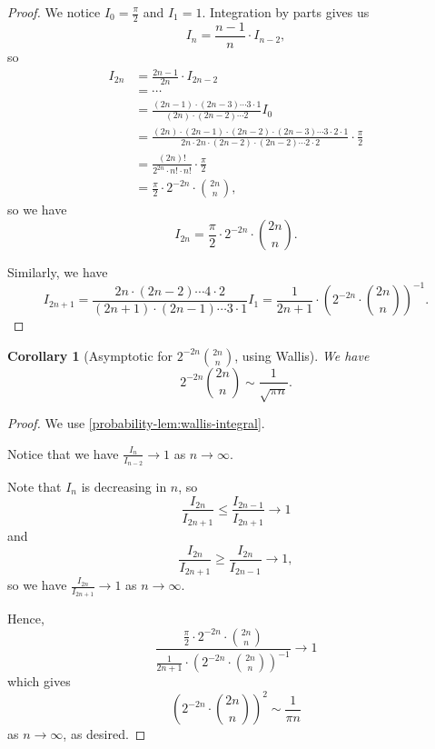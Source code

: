\documentclass[11pt]{article}
\numberwithin{equation}{section}
\newtheorem{corollary}[theorem]{Corollary}
\theoremstyle{definition}
\theoremstyle{remark}
\newcommand{\pqty}[1]{\left(#1\right)}
\newcommand{\inverse}{^{-1}}
\begin{document}
\begin{proof}\label{probability-proof-005}
    We notice \(I_0 = \frac{\pi}{2}\) and \(I_1 = 1\). Integration by parts gives us
    \[
        I_n = \frac{n - 1}{n} \cdot I_{n - 2},
    \]
    so
    \begin{align*}
        I_{2n} &= \frac{2n - 1}{2n} \cdot I_{2n - 2} \\
        &= \cdots \\
        &= \frac{\pqty{2n - 1} \cdot \pqty{2n - 3} \cdots 3 \cdot 1}{\pqty{2n} \cdot \pqty{2n - 2} \cdots 2} I_0 \\
        &= \frac{\pqty{2n} \cdot \pqty{2n - 1} \cdot \pqty{2n - 2} \cdot \pqty{2n - 3} \cdots 3 \cdot 2 \cdot 1}{2n \cdot 2n \cdot \pqty{2n - 2} \cdot \pqty{2n - 2} \cdots 2 \cdot 2} \cdot \frac{\pi}{2} \\
        &= \frac{\pqty{2n}!}{2^{2n} \cdot n! \cdot n!} \cdot \frac{\pi}{2} \\
        &= \frac{\pi}{2} \cdot 2^{-2n} \cdot \binom{2n}{n},
    \end{align*}
    so we have
    \[
        I_{2n} = \frac{\pi}{2} \cdot 2^{-2n} \cdot \binom{2n}{n}.
    \]

    Similarly, we have
    \[
        I_{2n + 1} = \frac{2n \cdot \pqty{2n - 2} \cdots 4 \cdot 2}{\pqty{2n + 1} \cdot \pqty{2n - 1} \cdots 3 \cdot 1} I_1 = \frac{1}{2n + 1} \cdot \pqty{2^{-2n} \cdot \binom{2n}{n}}\inverse.
    \]

\end{proof}

\begin{corollary}[Asymptotic for \(2^{-2n} \binom{2n}{n}\), using Wallis]\label{probability-corollary-002}
    \label{probability-cor:asymptotic-binomial-wallis}%
    We have
    \[
        2^{-2n} \binom{2n}{n} \sim \frac{1}{\sqrt{\pi n}}.
    \]
\end{corollary}

\begin{proof}\label{probability-proof-006}
    We use \autoref{probability-lem:wallis-integral}. 

    Notice that we have \(\frac{I_n}{I_{n - 2}} \to 1\) as \(n \to \infty\).

    Note that \(I_n\) is decreasing in \(n\), so
    \[
        \frac{I_{2n}}{I_{2n + 1}} \leq \frac{I_{2n - 1}}{I_{2n + 1}} \to 1
    \]
    and
    \[
        \frac{I_{2n}}{I_{2n + 1}} \geq \frac{I_{2n}}{I_{2n - 1}} \to 1,
    \]
    so we have \(\frac{I_{2n}}{I_{2n + 1}} \to 1\) as \(n \to \infty\).

    Hence,
    \[
        \frac{\frac{\pi}{2} \cdot 2^{-2n} \cdot \binom{2n}{n}}{\frac{1}{2n + 1} \cdot \pqty{2^{-2n} \cdot \binom{2n}{n}}\inverse} \to 1
    \]
    which gives
    \[
        \pqty{2^{-2n} \cdot \binom{2n}{n}}^2 \sim \frac{1}{\pi n}
    \]
    as \(n \to \infty\), as desired.
\end{proof}
\end{document}
